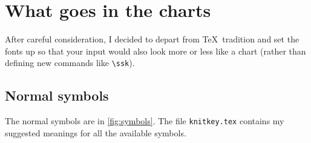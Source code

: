 \documentclass[draft]{amsart}
\begin{document}
\section{What goes in the charts}

After careful consideration, I decided to depart from \TeX\ tradition and set the fonts up so that your input would also look more or less like a chart (rather than defining new commands like \verb|\ssk|).

\subsection{Normal symbols}\label{se:normal} 

The normal symbols are in \autoref{fig:symbols}. The file \texttt{knitkey.tex} contains my suggested meanings for all the available symbols.

\makeatletter 
\let \barknit \bar@knit 
\let \barthinknit \barthin@knit
\makeatother
\end{document}

